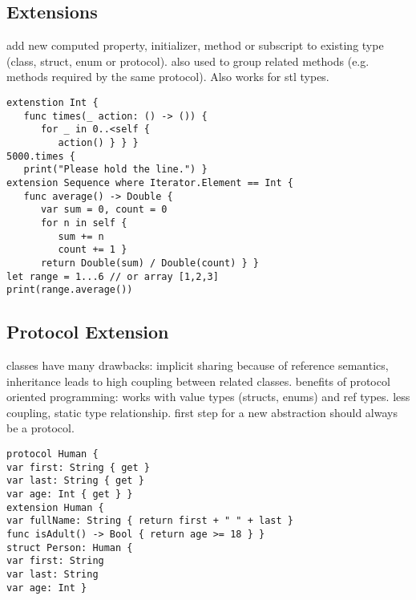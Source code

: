 \subsection{Extensions}
add new computed property, initializer, method or subscript to existing type (class, struct, enum or protocol). also used to group related methods (e.g. methods required by the same protocol). Also works for stl types.
\begin{lstlisting}
extenstion Int {
   func times(_ action: () -> ()) {
      for _ in 0..<self {
         action() } } }
5000.times {
   print("Please hold the line.") }
extension Sequence where Iterator.Element == Int {
   func average() -> Double {
      var sum = 0, count = 0
      for n in self {
         sum += n
         count += 1 }
      return Double(sum) / Double(count) } }
let range = 1...6 // or array [1,2,3]
print(range.average())
\end{lstlisting}

\subsection{Protocol Extension}
classes have many drawbacks: implicit sharing because of reference semantics, inheritance leads to high coupling between related classes. benefits of protocol oriented programming: works with value types (structs, enums) and ref types. less coupling, static type relationship. first step for a new abstraction should always be a protocol.
\begin{lstlisting}
protocol Human {
var first: String { get }
var last: String { get }
var age: Int { get } }
extension Human {
var fullName: String { return first + " " + last }
func isAdult() -> Bool { return age >= 18 } }
struct Person: Human {
var first: String
var last: String
var age: Int }
\end{lstlisting}

